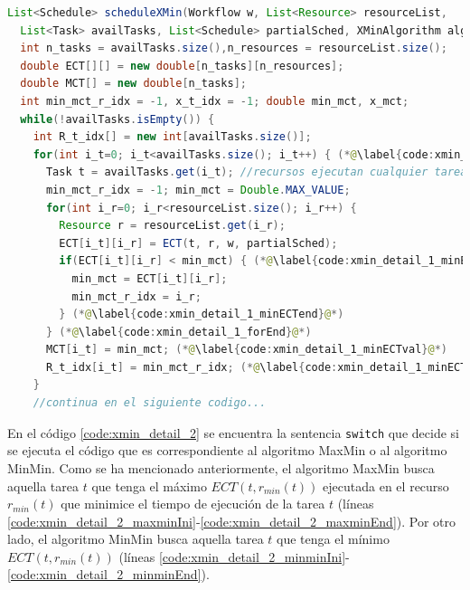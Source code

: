 \begin{lstlisting}[language=java,label={code:xmin_detail_1},caption={Método de MaxMin/MinMin que planifica las tareas (parte 1)},float]
List<Schedule> scheduleXMin(Workflow w, List<Resource> resourceList, 
  List<Task> availTasks, List<Schedule> partialSched, XMinAlgorithm algorithm) {
  int n_tasks = availTasks.size(),n_resources = resourceList.size();
  double ECT[][] = new double[n_tasks][n_resources];
  double MCT[] = new double[n_tasks];
  int min_mct_r_idx = -1, x_t_idx = -1; double min_mct, x_mct;
  while(!availTasks.isEmpty()) {
    int R_t_idx[] = new int[availTasks.size()];
    for(int i_t=0; i_t<availTasks.size(); i_t++) { (*@\label{code:xmin_detail_1_forIni}@*)
      Task t = availTasks.get(i_t); //recursos ejecutan cualquier tarea
      min_mct_r_idx = -1; min_mct = Double.MAX_VALUE;
      for(int i_r=0; i_r<resourceList.size(); i_r++) {
        Resource r = resourceList.get(i_r);
        ECT[i_t][i_r] = ECT(t, r, w, partialSched);
        if(ECT[i_t][i_r] < min_mct) { (*@\label{code:xmin_detail_1_minECTini}@*)
          min_mct = ECT[i_t][i_r];
          min_mct_r_idx = i_r;
        } (*@\label{code:xmin_detail_1_minECTend}@*)
      } (*@\label{code:xmin_detail_1_forEnd}@*)
      MCT[i_t] = min_mct; (*@\label{code:xmin_detail_1_minECTval}@*)
      R_t_idx[i_t] = min_mct_r_idx; (*@\label{code:xmin_detail_1_minECTidx}@*)
    }
    //continua en el siguiente codigo...
\end{lstlisting}

En el código \ref{code:xmin_detail_2} se encuentra la sentencia \texttt{switch} que decide si se ejecuta el código que es correspondiente al algoritmo MaxMin o al algoritmo MinMin. Como se ha mencionado anteriormente, el algoritmo MaxMin busca aquella tarea $t$ que tenga el máximo $ECT(t,r_{min}(t))$ ejecutada en el recurso $r_{min}(t)$ que minimice el tiempo de ejecución de la tarea $t$ (líneas \ref{code:xmin_detail_2_maxminIni}-\ref{code:xmin_detail_2_maxminEnd}). Por otro lado, el algoritmo MinMin busca aquella tarea $t$ que tenga el mínimo $ECT(t,r_{min}(t))$ (líneas \ref{code:xmin_detail_2_minminIni}-\ref{code:xmin_detail_2_minminEnd}).

